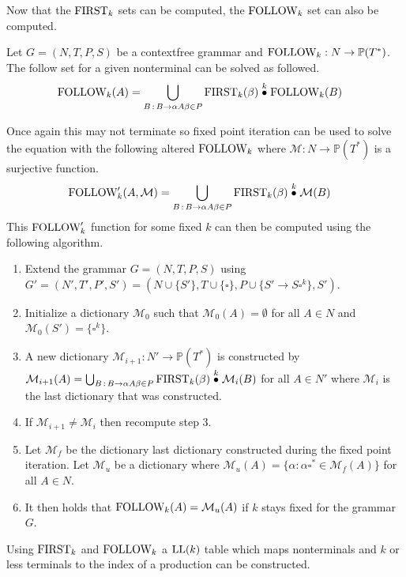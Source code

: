 Now that the $\text{FIRST}_k$ sets can be computed, the $\text{FOLLOW}_k$ set can also be computed. 
\begin{algorithm}
    \label{algorithm:follow}
    Let $G = (N, T, P, S)$ be a context\-free grammar and $\text{FOLLOW}_k: N \to \mathbb{P}(T^*)$. The follow set for a given nonterminal can be solved as followed.
    \begin{align*}
        \FOLLOW_k(A) &= \bigcup_{B \, : \, B \to \alpha A \beta \in P} \FIRST_k(\beta) \truncprod{k} \FOLLOW_k(B)
    \end{align*}
\end{algorithm}
\noindent Once again this may not terminate so fixed point iteration can be used to solve the equation with the following altered $\text{FOLLOW}_k$ where $\mathcal{M}: N \to \mathbb{P}(T^*)$ is a surjective function.
\begin{align*}
    \FOLLOW'_k(A, \mathcal{M}) &= \bigcup_{B \,: \, B \to \alpha A \beta \in P} \FIRST_k(\beta) \truncprod{k} \mathcal{M}(B)
\end{align*}
This $\text{FOLLOW}'_k$ function for some fixed $k$ can then be computed using the following algorithm.
\begin{enumerate}
    \item Extend the grammar $G = (N, T, P, S)$ using $G' = (N', T', P', S') = (N \cup \{S'\}, T \cup \{\square\}, P \cup \{S' \to S \square^k\}, S')$.
    \item Initialize a dictionary $\mathcal{M}_0$ such that $\mathcal{M}_0(A) = \emptyset$ for all $A \in N$ and $\mathcal{M}_0(S') = \{\square^k\}$.
    \item A new dictionary $\mathcal{M}_{i+1}: N' \to \mathbb{P}(T^*)$ is constructed by $\mathcal{M}_{i+1}(A) = \bigcup_{B \,: \, B \to  \alpha A \beta \in P} \FIRST_k(\beta) \truncprod{k} \mathcal{M}_{i}(B)$ for all $A \in N'$ where $\mathcal{M}_{i}$ is the last dictionary that was constructed.
    \item If $\mathcal{M}_{i+1} \neq \mathcal{M}_{i}$ then recompute step 3.
    \item Let $\mathcal{M}_f$ be the dictionary last dictionary constructed during the fixed point iteration. Let $\mathcal{M}_u$ be a dictionary where $\mathcal{M}_u(A) = \{\alpha : \alpha \square^* \in \mathcal{M}_f(A)\}$ for all $A \in N$.
    \item It then holds that $\text{FOLLOW}_k(A) = \mathcal{M}_u(A)$ if $k$ stays fixed for the grammar $G$.
\end{enumerate}
Using $\text{FIRST}_k$ and $\text{FOLLOW}_k$ a $\text{LL}(k)$ table which maps nonterminals and $k$ or less terminals to the index of a production can be constructed.
